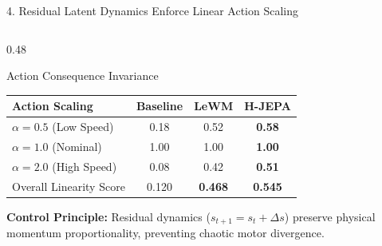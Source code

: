 \documentclass[aspectratio=169, 10pt]{beamer}
\begin{document}
\begin{frame}{4. Residual Latent Dynamics Enforce Linear Action Scaling}
\begin{columns}[T]
    \begin{column}{0.48\textwidth}
      \begin{block}{Action Consequence Invariance}
        \scriptsize
        \centering
        \setlength{\tabcolsep}{3pt}
        \begin{tabular}{lccc}
          \toprule
          \textbf{Action Scaling} & \textbf{Baseline} & \textbf{LeWM} & \textbf{H-JEPA} \\
          \midrule
          $\alpha = 0.5$ (Low Speed) & 0.18 & 0.52 & \textbf{0.58} \\
          $\alpha = 1.0$ (Nominal) & 1.00 & 1.00 & \textbf{1.00} \\
          $\alpha = 2.0$ (High Speed) & 0.08 & 0.42 & \textbf{0.51} \\
          Overall Linearity Score & \alert{0.120} & \textbf{0.468} & \textbf{0.545} \\
          \bottomrule
        \end{tabular}
      \end{block}
      \vspace{0.05cm}
      \scriptsize \textbf{Control Principle:} Residual dynamics ($s_{t+1} = s_t + \Delta s$) preserve physical momentum proportionality, preventing chaotic motor divergence.
    \end{column}
  \end{columns}
\end{frame}
\end{document}
